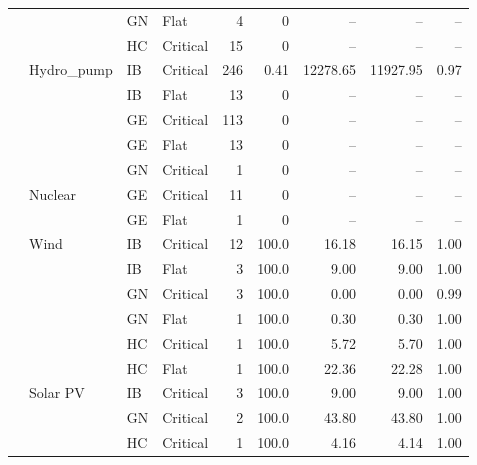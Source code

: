 \begin{longtable}{@{}l l l l r r r r r@{}}
 &  & GN & Flat & 4 & 0 & -- & -- & -- \\
 &  & HC & Critical & 15 & 0 & -- & -- & -- \\
\addlinespace
 & Hydro\_pump & IB & Critical & 246 & 0.41 & 12278.65 & 11927.95 & 0.97 \\
 &  & IB & Flat & 13 & 0 & -- & -- & -- \\
 &  & GE & Critical & 113 & 0 & -- & -- & -- \\
 &  & GE & Flat & 13 & 0 & -- & -- & -- \\
 &  & GN & Critical & 1 & 0 & -- & -- & -- \\
\addlinespace
 & Nuclear & GE & Critical & 11 & 0 & -- & -- & -- \\
 &  & GE & Flat & 1 & 0 & -- & -- & -- \\
\addlinespace
 & Wind & IB & Critical & 12 & 100.0 & 16.18 & 16.15 & 1.00 \\
 &  & IB & Flat & 3 & 100.0 & 9.00 & 9.00 & 1.00 \\
 &  & GN & Critical & 3 & 100.0 & 0.00 & 0.00 & 0.99 \\
 &  & GN & Flat & 1 & 100.0 & 0.30 & 0.30 & 1.00 \\
 &  & HC & Critical & 1 & 100.0 & 5.72 & 5.70 & 1.00 \\
 &  & HC & Flat & 1 & 100.0 & 22.36 & 22.28 & 1.00 \\
\addlinespace
 & Solar PV & IB & Critical & 3 & 100.0 & 9.00 & 9.00 & 1.00 \\
 &  & GN & Critical & 2 & 100.0 & 43.80 & 43.80 & 1.00 \\
 &  & HC & Critical & 1 & 100.0 & 4.16 & 4.14 & 1.00 \\
\end{longtable}
\normalsize
